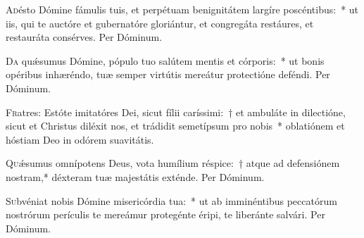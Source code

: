 \documentclass[vesperale_romanum.tex]{subfiles}
\begin{document}


\oratio

\lettrine{A}{d}ésto Dómine fámulis tuis, et perpétuam benignitátem largíre poscéntibus:~* ut iis, qui te auctóre et gubernatóre gloriántur, et congregáta restáures, et restauráta consérves. Per Dóminum.



\oratio

\lettrine{D}{a} quǽsumus Dómine, pópulo tuo salútem mentis et córporis:~* ut bonis opéribus inhæréndo, tuæ semper virtútis mereátur protectióne deféndi. Per Dóminum.


\capitulum

\lettrine{F}{r}atres: Estóte imitatóres Dei, sicut fílii caríssimi:~† et ambuláte in dilectióne, sicut et Christus diléxit nos, et trádidit semetípsum pro nobis~* oblatiónem et hóstiam Deo in odórem suavitátis.



\oratio

\lettrine{Q}{u}ǽsumus omnípotens Deus, vota humílium réspice:~† atque ad defensiónem nostram,* déxteram tuæ majestátis exténde.
Per Dóminum.







\oratio

\lettrine{S}{u}bvéniat nobis Dómine misericórdia tua:~* ut ab imminéntibus peccatórum nostrórum perículis te mereámur protegénte éripi, te liberánte salvári.
Per Dóminum.
\end{document}
